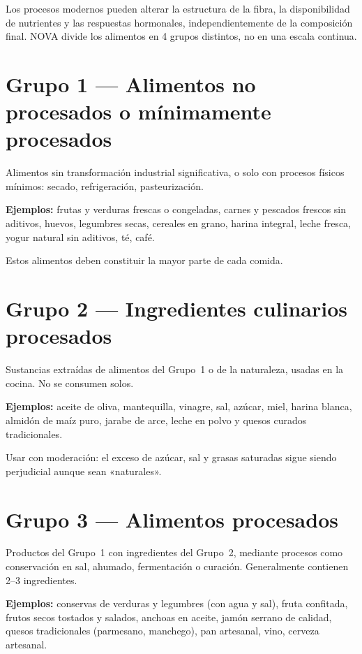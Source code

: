 \documentclass[a5paper,12pt,oneside,openany]{book}
\newcommand{\boxverde}[2]{%
  \begin{tcolorbox}[cajabase,
    colback=verdescuro!8!white, colframe=verdescuro, title={#1}]
  #2\end{tcolorbox}}
\begin{document}
Los procesos modernos pueden alterar la estructura de la fibra, la disponibilidad
de nutrientes y las respuestas hormonales, independientemente de la composición
final. NOVA divide los alimentos en 4 grupos distintos, no en una escala continua.

\section{Grupo 1 --- Alimentos no procesados o mínimamente procesados}

Alimentos sin transformación industrial significativa, o solo con procesos físicos
mínimos: secado, refrigeración, pasteurización.

\textbf{Ejemplos:} frutas y verduras frescas o congeladas, carnes y pescados
frescos sin aditivos, huevos, legumbres secas, cereales en grano, harina
integral, leche fresca, yogur natural sin aditivos, té, café.

\boxverde{Objetivo}{Estos alimentos deben constituir la mayor parte de cada comida.}

\section{Grupo 2 --- Ingredientes culinarios procesados}

Sustancias extraídas de alimentos del Grupo~1 o de la naturaleza, usadas en la
cocina. No se consumen solos.

\textbf{Ejemplos:} aceite de oliva, mantequilla, vinagre, sal, azúcar, miel,
harina blanca, almidón de maíz puro, jarabe de arce, leche en polvo y quesos
curados tradicionales.

Usar con moderación: el exceso de azúcar, sal y grasas saturadas sigue siendo
perjudicial aunque sean «naturales».

\section{Grupo 3 --- Alimentos procesados}

Productos del Grupo~1 con ingredientes del Grupo~2, mediante procesos como
conservación en sal, ahumado, fermentación o curación. Generalmente contienen
2--3 ingredientes.

\textbf{Ejemplos:} conservas de verduras y legumbres (con agua y sal), fruta
confitada, frutos secos tostados y salados, anchoas en aceite, jamón serrano
de calidad, quesos tradicionales (parmesano, manchego), pan artesanal, vino,
cerveza artesanal.
\end{document}
